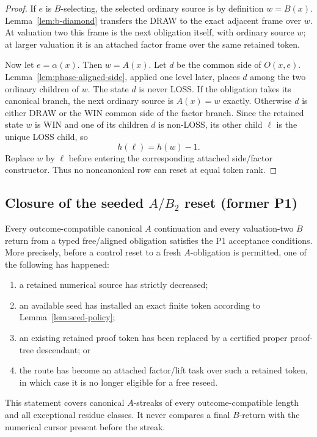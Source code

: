 \begin{proof}
If $e$ is $B$-selecting, the selected ordinary source is by definition
$w=B(x)$.  Lemma~\ref{lem:b-diamond} transfers the DRAW to the exact adjacent
frame over $w$.  At valuation two this frame is the next obligation itself,
with ordinary source $w$; at larger valuation it is an attached factor frame
over the same retained token.

Now let $e=\alpha(x)$.  Then $w=A(x)$.  Let $d$ be the common side of
$O(x,e)$.  Lemma~\ref{lem:phase-aligned-side}, applied one level later,
places $d$ among the two ordinary children of $w$.  The state $d$ is never
LOSS.  If the obligation takes its canonical branch, the next ordinary
source is $A(x)=w$ exactly.  Otherwise $d$ is either DRAW or the WIN common
side of the factor branch.  Since the retained state $w$ is WIN and one of
its children $d$ is non-LOSS, its other child $\ell$ is the unique LOSS
child, so
\[
 h(\ell)=h(w)-1.
\]
Replace $w$ by $\ell$ before entering the corresponding attached side/factor
constructor.  Thus no noncanonical row can reset at equal token rank.
\end{proof}

\subsection{Closure of the seeded $A/B_2$ reset (former P1)}

\begin{proposition}\label{prop:P1-closed}
Every outcome-compatible canonical $A$ continuation and every valuation-two
$B$ return from a typed free/aligned obligation satisfies the P1 acceptance
conditions.  More precisely, before a control reset to a fresh $A$-obligation
is permitted, one of the following has happened:
\begin{enumerate}[label=(\roman*)]
\item a retained numerical source has strictly decreased;
\item an available seed has installed an exact finite token according to
      Lemma~\ref{lem:seed-policy};
\item an existing retained proof token has been replaced by a certified proper
      proof-tree descendant; or
\item the route has become an attached factor/lift task over such a retained
      token, in which case it is no longer eligible for a free reseed.
\end{enumerate}
This statement covers canonical $A$-streaks of every outcome-compatible
length and all exceptional residue classes.  It never compares a final
$B$-return with the numerical cursor present before the streak.
\end{proposition}

